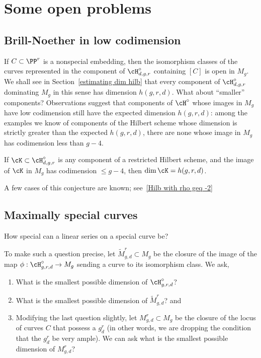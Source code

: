 \section{Some open problems}\label{open problems}

\subsection{Brill-Noether in low codimension}
 
If $C\subset \PP^r$ is a nonspecial embedding, then the isomorphism classes of the curves represented
in the component of $\cH^\circ_{d,g,r}$ containing $[C]$ is open in $M_g$. We shall see in Section~\ref{estimating dim hilb} that every component of $\cH^\circ_{d,g,r}$  dominating $M_g$ in this sense has dimension $h(g,r,d)$. 
What about ``smaller'' components?
Observations suggest that components of $\cH^\circ$ whose images in $M_g$ have low codimension still have the expected dimension $h(g,r,d)$: among the examples we know of components of the Hilbert scheme whose dimension is strictly greater than the expected $h(g,r,d)$, there are none whose image in $M_g$ has codimension less than $g-4$. 

\begin{conjecture}\label{large rho hilb dimension}
If $\cK \subset \cH^\circ_{d,g,r}$ is any component of a restricted Hilbert scheme, and the image of $\cK$ in $M_g$ has codimension $\leq g-4$, then $\dim \cK = h(g,r,d)$.
\end{conjecture}

A few cases of this conjecture are known; see~\ref{Hilb with rho geq -2}

\subsection{Maximally special  curves} 
How special can a linear series on a special curve be?

To make such a question precise, let $\widetilde M^r_{g,d} \subset M_g$ be the closure of the image of the map $\phi : \cH^\circ_{g,r,d}\to M_g$ sending a curve to its isomorphism class. We ask,
\begin{enumerate}
\item What is the smallest possible dimension of $\cH^\circ_{g,r,d}$? 
\item What is the smallest possible dimension of $\widetilde M^r_{g,d}$? and
\item Modifying the last question slightly, let $M^r_{g,d} \subset M_g$ be the closure of the locus of curves $C$ that possess a $g^r_d$ (in other words, we are dropping the condition that the $g^r_d$ be very ample). We can ask what is the smallest possible dimension of $M^r_{g,d}$?
\end{enumerate}

